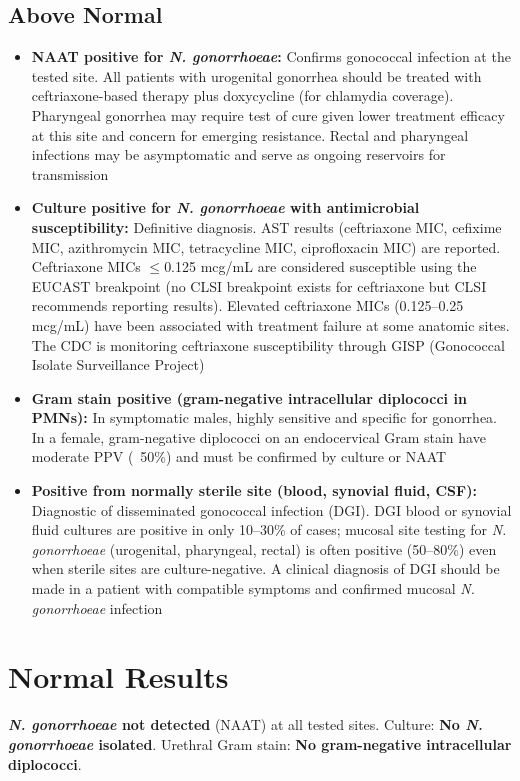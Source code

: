 \subsection*{Above Normal}
\begin{itemize}
  \item \textbf{NAAT positive for \textit{N. gonorrhoeae}:} Confirms gonococcal infection at the tested site. All patients with urogenital gonorrhea should be treated with ceftriaxone-based therapy plus doxycycline (for chlamydia coverage). Pharyngeal gonorrhea may require test of cure given lower treatment efficacy at this site and concern for emerging resistance. Rectal and pharyngeal infections may be asymptomatic and serve as ongoing reservoirs for transmission
  \item \textbf{Culture positive for \textit{N. gonorrhoeae} with antimicrobial susceptibility:} Definitive diagnosis. AST results (ceftriaxone MIC, cefixime MIC, azithromycin MIC, tetracycline MIC, ciprofloxacin MIC) are reported. Ceftriaxone MICs $\leq$0.125 mcg/mL are considered susceptible using the EUCAST breakpoint (no CLSI breakpoint exists for ceftriaxone but CLSI recommends reporting results). Elevated ceftriaxone MICs (0.125--0.25 mcg/mL) have been associated with treatment failure at some anatomic sites. The CDC is monitoring ceftriaxone susceptibility through GISP (Gonococcal Isolate Surveillance Project)
  \item \textbf{Gram stain positive (gram-negative intracellular diplococci in PMNs):} In symptomatic males, highly sensitive and specific for gonorrhea. In a female, gram-negative diplococci on an endocervical Gram stain have moderate PPV (~50\%) and must be confirmed by culture or NAAT
  \item \textbf{Positive from normally sterile site (blood, synovial fluid, CSF):} Diagnostic of disseminated gonococcal infection (DGI). DGI blood or synovial fluid cultures are positive in only 10--30\% of cases; mucosal site testing for \textit{N. gonorrhoeae} (urogenital, pharyngeal, rectal) is often positive (50--80\%) even when sterile sites are culture-negative. A clinical diagnosis of DGI should be made in a patient with compatible symptoms and confirmed mucosal \textit{N. gonorrhoeae} infection
\end{itemize}

\section*{Normal Results}
\textbf{\textit{N. gonorrhoeae} not detected} (NAAT) at all tested sites. Culture: \textbf{No \textit{N. gonorrhoeae} isolated}. Urethral Gram stain: \textbf{No gram-negative intracellular diplococci}.

